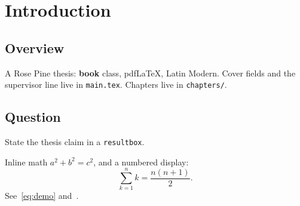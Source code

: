 \chapter{Introduction}
\label{ch:intro}

\section{Overview}

A Rose Pine thesis: \textbf{book} class, pdfLaTeX, Latin Modern.
Cover fields and the supervisor line live in \texttt{main.tex}.
Chapters live in \texttt{chapters/}.

\section{Question}

\begin{resultbox}
State the thesis claim in a \texttt{resultbox}.
\end{resultbox}

Inline math $a^2 + b^2 = c^2$, and a numbered display:
\begin{equation}
  \label{eq:demo}
  \sum_{k=1}^{n} k = \frac{n(n+1)}{2}.
\end{equation}
See~\eqref{eq:demo} and~\cite{rosepine2026}.
